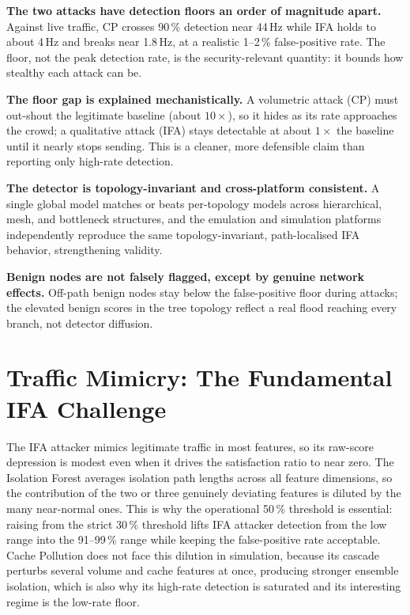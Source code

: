 \documentclass[12pt]{report}
\begin{document}
\textbf{The two attacks have detection floors an order of magnitude apart.} Against live traffic, CP crosses 90\,\% detection near 44\,Hz while IFA holds to about 4\,Hz and breaks near 1.8\,Hz, at a realistic 1--2\,\% false-positive rate. The floor, not the peak detection rate, is the security-relevant quantity: it bounds how stealthy each attack can be.

\textbf{The floor gap is explained mechanistically.} A volumetric attack (CP) must out-shout the legitimate baseline (about $10\times$), so it hides as its rate approaches the crowd; a qualitative attack (IFA) stays detectable at about $1\times$ the baseline until it nearly stops sending. This is a cleaner, more defensible claim than reporting only high-rate detection.

\textbf{The detector is topology-invariant and cross-platform consistent.} A single global model matches or beats per-topology models across hierarchical, mesh, and bottleneck structures, and the emulation and simulation platforms independently reproduce the same topology-invariant, path-localised IFA behavior, strengthening validity.

\textbf{Benign nodes are not falsely flagged, except by genuine network effects.} Off-path benign nodes stay below the false-positive floor during attacks; the elevated benign scores in the tree topology reflect a real flood reaching every branch, not detector diffusion.

\section{Traffic Mimicry: The Fundamental IFA Challenge}

The IFA attacker mimics legitimate traffic in most features, so its raw-score depression is modest even when it drives the satisfaction ratio to near zero. The Isolation Forest averages isolation path lengths across all feature dimensions, so the contribution of the two or three genuinely deviating features is diluted by the many near-normal ones. This is why the operational 50\,\% threshold is essential: raising from the strict 30\,\% threshold lifts IFA attacker detection from the low range into the 91--99\,\% range while keeping the false-positive rate acceptable. Cache Pollution does not face this dilution in simulation, because its cascade perturbs several volume and cache features at once, producing stronger ensemble isolation, which is also why its high-rate detection is saturated and its interesting regime is the low-rate floor.
\end{document}
